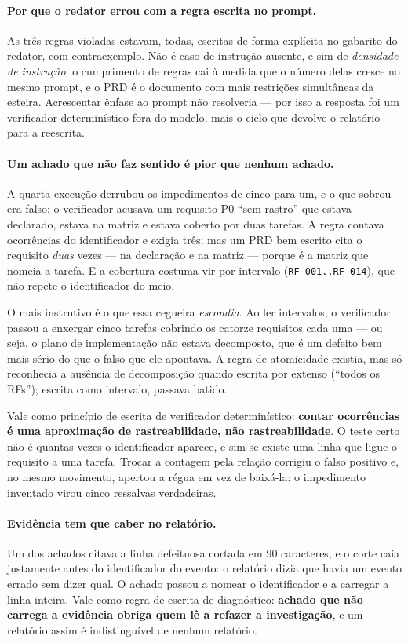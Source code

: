 \documentclass[11pt,a4paper]{article}
\newcommand{\cod}[1]{\texttt{\small #1}}
\begin{document}
\paragraph{Por que o redator errou com a regra escrita no prompt.} As três regras violadas estavam,
todas, escritas de forma explícita no gabarito do redator, com contraexemplo. Não é caso de
instrução ausente, e sim de \emph{densidade de instrução}: o cumprimento de regras cai à medida que
o número delas cresce no mesmo prompt, e o PRD é o documento com mais restrições simultâneas da
esteira. Acrescentar ênfase ao prompt não resolveria --- por isso a resposta foi um verificador
determinístico fora do modelo, mais o ciclo que devolve o relatório para a reescrita.

\paragraph{Um achado que não faz sentido é pior que nenhum achado.} A quarta execução derrubou os
impedimentos de cinco para um, e o que sobrou era falso: o verificador acusava um requisito P0 ``sem
rastro'' que estava declarado, estava na matriz e estava coberto por duas tarefas. A regra contava
ocorrências do identificador e exigia três; mas um PRD bem escrito cita o requisito \emph{duas}
vezes --- na declaração e na matriz --- porque é a matriz que nomeia a tarefa. E a cobertura costuma
vir por intervalo (\cod{RF-001..RF-014}), que não repete o identificador do meio.

O mais instrutivo é o que essa cegueira \emph{escondia}. Ao ler intervalos, o verificador passou a
enxergar cinco tarefas cobrindo os catorze requisitos cada uma --- ou seja, o plano de implementação
não estava decomposto, que é um defeito bem mais sério do que o falso que ele apontava. A regra de
atomicidade existia, mas só reconhecia a ausência de decomposição quando escrita por extenso
(``todos os RFs''); escrita como intervalo, passava batido.

Vale como princípio de escrita de verificador determinístico: \textbf{contar ocorrências é uma
aproximação de rastreabilidade, não rastreabilidade}. O teste certo não é quantas vezes o
identificador aparece, e sim se existe uma linha que ligue o requisito a uma tarefa. Trocar a
contagem pela relação corrigiu o falso positivo e, no mesmo movimento, apertou a régua em vez de
baixá-la: o impedimento inventado virou cinco ressalvas verdadeiras.

\paragraph{Evidência tem que caber no relatório.} Um dos achados citava a linha defeituosa cortada
em 90 caracteres, e o corte caía justamente antes do identificador do evento: o relatório dizia que
havia um evento errado sem dizer qual. O achado passou a nomear o identificador e a carregar a linha
inteira. Vale como regra de escrita de diagnóstico: \textbf{achado que não carrega a evidência
obriga quem lê a refazer a investigação}, e um relatório assim é indistinguível de nenhum relatório.
\end{document}
